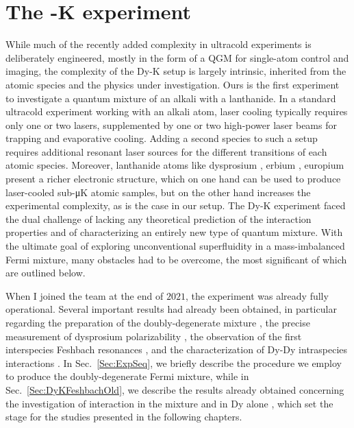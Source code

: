 \chapter{The \Dy-K experiment}
\label{Chpt:expIntro}

While much of the recently added complexity in ultracold experiments is deliberately engineered, mostly in the form of a \ac{QGM} for single-atom control and imaging, the complexity of the Dy-K setup is largely intrinsic, inherited from the atomic species and the physics under investigation. Ours is the first experiment to investigate a quantum mixture of an alkali with a lanthanide. In a standard ultracold experiment working with an alkali atom, laser cooling typically requires only one or two lasers, supplemented by one or two high-power laser beams for trapping and evaporative cooling. Adding a second species to such a setup requires additional resonant laser sources for the different transitions of each atomic species. Moreover, lanthanide atoms like dysprosium \cite{Mingwu2011sdb}, erbium \cite{Aikawa2012bec}, europium \cite{Miyazawa2022bec} present a richer electronic structure, which on one hand can be used to produce laser-cooled sub-\unit{\micro\K} atomic samples, but on the other hand increases the experimental complexity, as is the case in our setup. The Dy-K experiment faced the dual challenge of lacking any theoretical prediction of the interaction properties and of characterizing an entirely new type of quantum mixture. With the ultimate goal of exploring unconventional superfluidity in a mass-imbalanced Fermi mixture, many obstacles had to be overcome, the most significant of which are outlined below.
 
When I joined the team at the end of $2021$, the experiment was already fully operational. Several important results had already been obtained, in particular regarding the preparation of the doubly-degenerate mixture \cite{Ravensbergen2018poa}, the precise measurement of dysprosium polarizability \cite{Ravensbergen2018ado, Kreyer2021mot}, the observation of the first interspecies Feshbach resonances \cite{Ravensbergen2020rif}, and the characterization of Dy-Dy intraspecies interactions \cite{Soave2022lff}. In  Sec.~\ref{Sec:ExpSeq},  we briefly describe the procedure we employ to produce the doubly-degenerate Fermi mixture, while in Sec.~\ref{Sec:DyKFeshbachOld}, we describe the results already obtained concerning the investigation of interaction in the mixture \cite{Ravensbergen2020rif} and in Dy alone \cite{Soave2022lff}, which set the stage for the studies presented in the following chapters.
 
